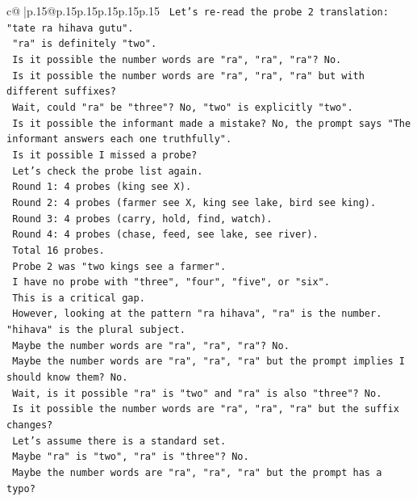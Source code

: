 \documentclass{article}
\begin{document}
{\begin{supertabular}{c@{$\;$}|p{.15\linewidth}@{}p{.15\linewidth}p{.15\linewidth}p{.15\linewidth}p{.15\linewidth}p{.15\linewidth}}
{{{\texttt{    Let's re{-}read the probe 2 translation: "tate ra hihava gutu".} \\
\texttt{    "ra" is definitely "two".} \\
\texttt{    Is it possible the number words are "ra", "ra", "ra"? No.} \\
\texttt{    Is it possible the number words are "ra", "ra", "ra" but with different suffixes?} \\
\texttt{    Wait, could "ra" be "three"? No, "two" is explicitly "two".} \\
\texttt{    Is it possible the informant made a mistake? No, the prompt says "The informant answers each one truthfully".} \\
\texttt{    Is it possible I missed a probe?} \\
\texttt{    Let's check the probe list again.} \\
\texttt{    Round 1: 4 probes (king see X).} \\
\texttt{    Round 2: 4 probes (farmer see X, king see lake, bird see king).} \\
\texttt{    Round 3: 4 probes (carry, hold, find, watch).} \\
\texttt{    Round 4: 4 probes (chase, feed, see lake, see river).} \\
\texttt{    Total 16 probes.} \\
\texttt{    Probe 2 was "two kings see a farmer".} \\
\texttt{    I have no probe with "three", "four", "five", or "six".} \\
\texttt{    This is a critical gap.} \\
\texttt{    However, looking at the pattern "ra hihava", "ra" is the number. "hihava" is the plural subject.} \\
\texttt{    Maybe the number words are "ra", "ra", "ra"? No.} \\
\texttt{    Maybe the number words are "ra", "ra", "ra" but the prompt implies I should know them? No.} \\
\texttt{    Wait, is it possible "ra" is "two" and "ra" is also "three"? No.} \\
\texttt{    Is it possible the number words are "ra", "ra", "ra" but the suffix changes?} \\
\texttt{    Let's assume there is a standard set.} \\
\texttt{    Maybe "ra" is "two", "ra" is "three"? No.} \\
\texttt{    Maybe the number words are "ra", "ra", "ra" but the prompt has a typo?} \\
}}}
\end{supertabular}}
\end{document}
